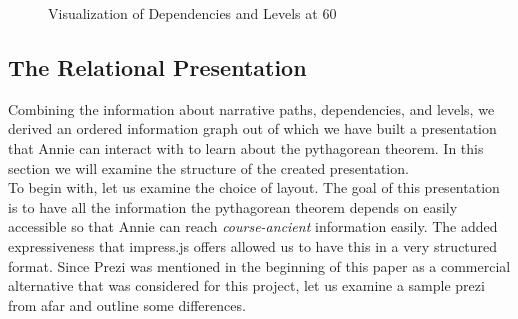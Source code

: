 \documentclass[twoside, 12pt]{article}
\begin{document}
\begin{figure}
\vspace{-0pt}
  \begin{center}
\vspace{-5pt}
  \caption{Visualization of Dependencies and Levels at 60\degree}
  \label{fig:visualDependencyDegree}
\vspace{-24pt}
  \end{center}
\end{figure}

\begin{figure}
\vspace{-50pt}
\end{figure}

\subsection{The Relational Presentation}
\label{sec:RelationalPresentations}

Combining the information about narrative paths, dependencies, and levels, we derived an ordered information graph out of which we have built a presentation that Annie can interact with to learn about the pythagorean theorem. In this section we will examine the structure of the created presentation.\\

To begin with, let us examine the choice of layout. The goal of this presentation is to have all the information the pythagorean theorem depends on easily accessible so that Annie can reach \textit{course-ancient} information easily. The added expressiveness that impress.js offers allowed us to have this in a very structured format. Since Prezi was mentioned in the beginning of this paper as a commercial alternative that was considered for this project, let us examine a sample prezi from afar and outline some differences.\\
\end{document}
